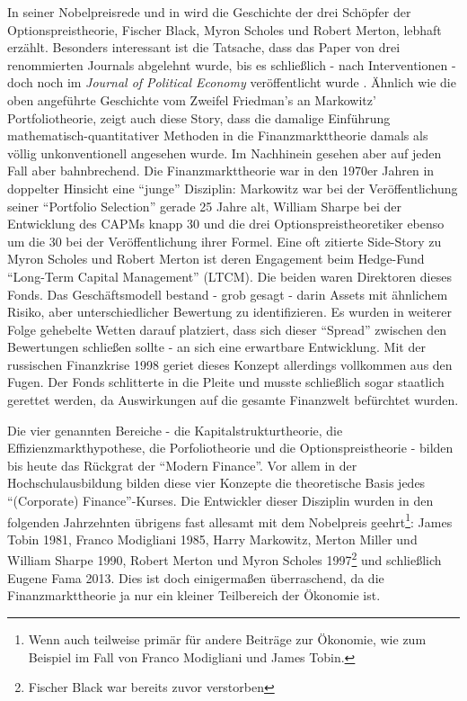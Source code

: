 In seiner Nobelpreisrede \parencite{Scholes1997} und in \textcite[S. 311]{Bernstein1996} wird die Geschichte der drei Schöpfer der Optionspreistheorie, Fischer Black, Myron Scholes und Robert Merton, lebhaft erzählt. Besonders interessant ist die Tatsache, dass das Paper \textcite{Black1973} von drei renommierten Journals abgelehnt wurde, bis es schließlich - nach Interventionen - doch noch im \textit{Journal of Political Economy} veröffentlicht wurde \parencite[S. 136]{Scholes1997}. Ähnlich wie die oben angeführte Geschichte vom Zweifel Friedman's an Markowitz' Portfoliotheorie, zeigt auch diese Story, dass die damalige Einführung mathematisch-quantitativer Methoden in die Finanzmarkttheorie damals als völlig unkonventionell angesehen wurde. Im Nachhinein gesehen aber auf jeden Fall aber bahnbrechend. Die Finanzmarkttheorie war in den 1970er Jahren in doppelter Hinsicht eine "`junge"' Disziplin: Markowitz war bei der Veröffentlichung seiner "`Portfolio Selection"' gerade 25 Jahre alt, William Sharpe bei der Entwicklung des CAPMs knapp 30 und die drei Optionspreistheoretiker ebenso um die 30 bei der Veröffentlichung ihrer Formel. Eine oft zitierte Side-Story zu Myron Scholes und Robert Merton ist deren Engagement beim Hedge-Fund "`Long-Term Capital Management"' (LTCM). Die beiden waren Direktoren dieses Fonds. Das Geschäftsmodell bestand - grob gesagt - darin Assets mit ähnlichem Risiko, aber unterschiedlicher Bewertung zu identifizieren. Es wurden in weiterer Folge gehebelte Wetten darauf platziert, dass sich dieser "`Spread"' zwischen den Bewertungen schließen sollte - an sich eine erwartbare Entwicklung. Mit der russischen Finanzkrise 1998 geriet dieses Konzept allerdings vollkommen aus den Fugen. Der Fonds schlitterte in die Pleite und musste schließlich sogar staatlich gerettet werden, da Auswirkungen auf die gesamte Finanzwelt befürchtet wurden.

Die vier genannten Bereiche - die Kapitalstrukturtheorie, die Effizienzmarkthypothese, die Porfoliotheorie und die Optionspreistheorie - bilden bis heute das Rückgrat der "`Modern Finance"'. Vor allem in der Hochschulausbildung bilden diese vier Konzepte die theoretische Basis jedes "`(Corporate) Finance"'-Kurses. Die Entwickler dieser Disziplin wurden in den folgenden Jahrzehnten übrigens fast allesamt mit dem Nobelpreis geehrt\footnote{Wenn auch teilweise primär für andere Beiträge zur Ökonomie, wie zum Beispiel im Fall von Franco Modigliani und James Tobin.}: James Tobin 1981, Franco Modigliani 1985, Harry Markowitz, Merton Miller und William Sharpe 1990, Robert Merton und Myron Scholes 1997\footnote{Fischer Black war bereits zuvor verstorben} und schließlich Eugene Fama 2013. Dies ist doch einigermaßen überraschend, da die Finanzmarkttheorie ja nur ein kleiner Teilbereich der Ökonomie ist.






